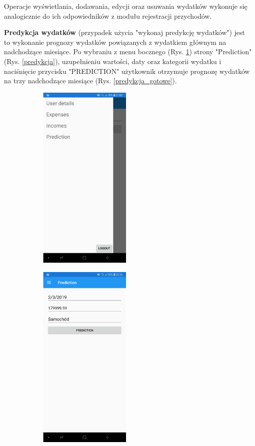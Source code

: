 Operacje wyświetlania, dodawania, edycji oraz usuwania wydatków wykonuje się analogicznie do ich odpowiedników z modułu rejestracji przychodów.

\textbf{Predykcja wydatków} (przypadek użycia "wykonaj predykcję wydatków") jest to wykonanie prognozy wydatków powiązanych z wydatkiem głównym na nadchodzące miesiące. Po wybraniu z menu bocznego (Rys. \ref{hamburger_predykcja}) strony "Prediction" (Rys. \ref{predykcja}), uzupełnieniu wartości, daty oraz kategorii wydatku i naciśnięcie przycisku "PREDICTION" użytkownik otrzymuje prognozę wydatków na trzy nadchodzące miesiące (Rys. \ref{predykcja_gotowe}).
\begin{figure}[!ht]
	\begin{center}
		\begin{subfigure}[b]{0.3\textwidth}
			\includegraphics[width=1.75in]{img/mobile/menu_boczne.jpg}
			\label{hamburger_predykcja}
		\end{subfigure}
		\begin{subfigure}[b]{0.3\textwidth}
			\includegraphics[width=1.75in]{img/mobile/predykcja.jpg}

\end{subfigure}
\end{center}
\end{figure}
